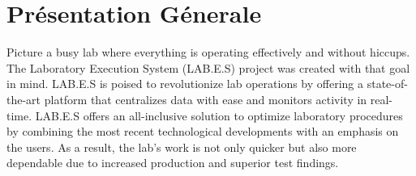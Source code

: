 \chapter{Présentation Génerale}

Picture a busy lab where everything is operating effectively and without hiccups. The Laboratory Execution System (LAB.E.S) project was created with that goal in mind. LAB.E.S is poised to revolutionize lab operations by offering a state-of-the-art platform that centralizes data with ease and monitors activity in real-time.
LAB.E.S offers an all-inclusive solution to optimize laboratory procedures by combining the most recent technological developments with an emphasis on the users. As a result, the lab's work is not only quicker but also more dependable due to increased production and superior test findings.



